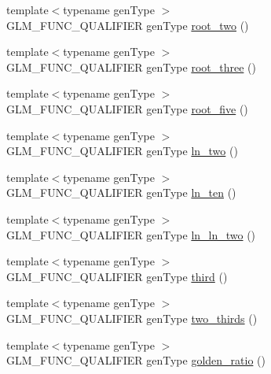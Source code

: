 \begin{DoxyCompactItemize}
\item 
{\footnotesize template$<$typename gen\+Type $>$ }\\G\+L\+M\+\_\+\+F\+U\+N\+C\+\_\+\+Q\+U\+A\+L\+I\+F\+I\+ER gen\+Type \hyperlink{group__gtc__constants_gab91b7799f88f9f2be33e385dec11b9c2}{root\+\_\+two} ()
\item 
{\footnotesize template$<$typename gen\+Type $>$ }\\G\+L\+M\+\_\+\+F\+U\+N\+C\+\_\+\+Q\+U\+A\+L\+I\+F\+I\+ER gen\+Type \hyperlink{group__gtc__constants_gab3183635ac615473e2f95852f491be83}{root\+\_\+three} ()
\item 
{\footnotesize template$<$typename gen\+Type $>$ }\\G\+L\+M\+\_\+\+F\+U\+N\+C\+\_\+\+Q\+U\+A\+L\+I\+F\+I\+ER gen\+Type \hyperlink{group__gtc__constants_gace2b8dfed1ab9fabbb67dde08e7e5b58}{root\+\_\+five} ()
\item 
{\footnotesize template$<$typename gen\+Type $>$ }\\G\+L\+M\+\_\+\+F\+U\+N\+C\+\_\+\+Q\+U\+A\+L\+I\+F\+I\+ER gen\+Type \hyperlink{group__gtc__constants_ga22fae798430edc3022766af4fd83e8a4}{ln\+\_\+two} ()
\item 
{\footnotesize template$<$typename gen\+Type $>$ }\\G\+L\+M\+\_\+\+F\+U\+N\+C\+\_\+\+Q\+U\+A\+L\+I\+F\+I\+ER gen\+Type \hyperlink{group__gtc__constants_ga48addf0cb0980277d208a71a1c59c073}{ln\+\_\+ten} ()
\item 
{\footnotesize template$<$typename gen\+Type $>$ }\\G\+L\+M\+\_\+\+F\+U\+N\+C\+\_\+\+Q\+U\+A\+L\+I\+F\+I\+ER gen\+Type \hyperlink{group__gtc__constants_ga650774609debe4a90bcac449b574de2c}{ln\+\_\+ln\+\_\+two} ()
\item 
{\footnotesize template$<$typename gen\+Type $>$ }\\G\+L\+M\+\_\+\+F\+U\+N\+C\+\_\+\+Q\+U\+A\+L\+I\+F\+I\+ER gen\+Type \hyperlink{group__gtc__constants_gabf280496105e0ad070287417f840ebd8}{third} ()
\item 
{\footnotesize template$<$typename gen\+Type $>$ }\\G\+L\+M\+\_\+\+F\+U\+N\+C\+\_\+\+Q\+U\+A\+L\+I\+F\+I\+ER gen\+Type \hyperlink{group__gtc__constants_gadde7f2efce3b14c8b26944fbafed4a10}{two\+\_\+thirds} ()
\item 
{\footnotesize template$<$typename gen\+Type $>$ }\\G\+L\+M\+\_\+\+F\+U\+N\+C\+\_\+\+Q\+U\+A\+L\+I\+F\+I\+ER gen\+Type \hyperlink{group__gtc__constants_gafd53093ef2d756333865d774bea3cdf9}{golden\+\_\+ratio} ()

\end{DoxyCompactItemize}
